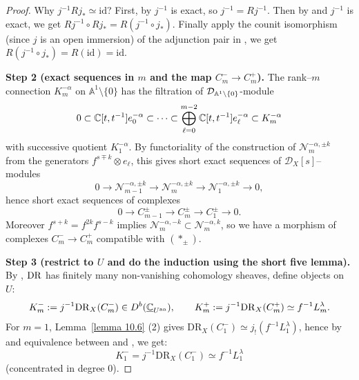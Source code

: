 \begin{proof}
    Why $j^{-1}Rj_* \simeq \mathrm{id}$?
    First, by \cite[Eq.~C.2.6]{hotta2008d} $j^{-1}$ is exact, so $j^{-1} = Rj^{-1}$.
    Then by \cite[Proposition B.5.7.]{hotta2008d} and $j^{-1}$ is exact, we get $Rj^{-1}\circ Rj_* = R(j^{-1}\circ j_*)$.
    Finally apply the counit isomorphism (since $j$ is an open immersion) of the adjunction pair in \cite[Eq.~C.1.10]{hotta2008d}, we get $R(j^{-1}\circ j_*) = R(\mathrm{id}) = \mathrm{id}$.


    \medskip
    \noindent\textbf{Step 2 (exact sequences in $m$ and the map $C_m^{-}\to C_m^{+}$).}
    The rank--$m$ connection $K_m^{-\alpha}$ on $\mathbb{A}^1\setminus\{0\}$ has the filtration of $\mathcal{D}_{\mathbb{A}^1\setminus\{0\}}$-module
    \[
        0\subset \mathbb{C}[t,t^{-1}] e^{-\alpha}_0\subset\cdots\subset\bigoplus_{\ell=0}^{m-2}\mathbb{C}[t,t^{-1}]  e^{-\alpha}_\ell \subset K_m^{-\alpha}
    \]
    with successive quotient $K_1^{-\alpha}$.
    By functoriality of the construction of $\mathcal N_m^{-\alpha,\pm k}$ from the generators
    $f^{s\mp k}\otimes e_\ell$, this gives short exact sequences of $\mathcal D_X[s]$--modules
    \[
        0\to \mathcal N_{m-1}^{-\alpha,\pm k}\longrightarrow \mathcal N_m^{-\alpha,\pm k}
        \longrightarrow \mathcal N_1^{-\alpha,\pm k}\to 0,
    \]
    hence short exact sequences of complexes
    \[
        0\to C_{m-1}^{\pm}\longrightarrow C_m^{\pm}\longrightarrow C_1^{\pm}\to 0.
        \tag{$\ast_\pm$}
    \]
    Moreover $f^{s+k}=f^{2k}f^{s-k}$ implies $\mathcal N_m^{-\alpha,-k}\subset \mathcal N_m^{-\alpha,k}$,
    so we have a morphism of complexes $C_m^{-}\to C_m^{+}$ compatible with $(\ast_\pm)$.

    \medskip
    \noindent\textbf{Step 3 (restrict to $U$ and do the induction using the short five lemma).}
    By \cite[Sect.~4.2]{hotta2008d}, $\mathrm{DR}$ has finitely many non-vanishing cohomology sheaves, define objects on $U$:
    \[
        K_m^{-}:=j^{-1}\mathrm{DR}_X(C_m^{-})\in D^b(\underline{\mathbb{C}}_{U^{\mathrm{an}}}),\qquad
        K_m^{+}:=j^{-1}\mathrm{DR}_X(C_m^{+})\simeq f^{-1}L_m^\lambda.
    \]
    For $m=1$, Lemma~\ref{lemma 10.6} (2) gives $\mathrm{DR}_X(C_1^{-})\simeq j_!(f^{-1}L_1^\lambda)$, hence by
    \cite[\href{https://stacks.math.columbia.edu/tag/00A7}{Tag 00A7}]{stacks-project} and equivalence between \cite[\href{https://stacks.math.columbia.edu/tag/00A4}{Tag 00A4}]{stacks-project} and \cite[Definition~C.1.1]{hotta2008d}, we get:
    \[
        K_1^{-}=j^{-1}\mathrm{DR}_X(C_1^{-})\simeq f^{-1}L_1^\lambda
    \]
    (concentrated in degree $0$).

    \medskip


\end{proof}
